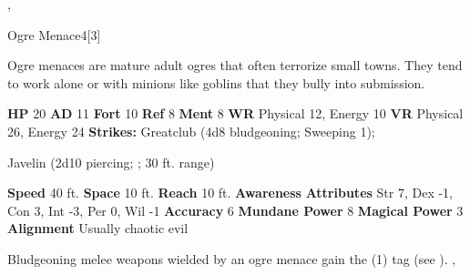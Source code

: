   ,
  \begin{monsubsection}{Ogre Menace}{4}[3]
    \vspace{-1em}\vspace{-1em}
    \vspace{0em}

    
        Ogre menaces are mature adult ogres that often terrorize small towns.
        They tend to work alone or with minions like goblins that they bully into submission.
      
    

    \begin{spellcontent}
      \begin{spelltargetinginfo}
        \pari \textbf{HP} 20 \monsep
          \textbf{AD} 11 \monsep
          \textbf{Fort} 10 \monsep
          \textbf{Ref} 8 \monsep
          \textbf{Ment} 8
        \pari \textbf{WR} Physical 12, Energy 10 \monsep
        \textbf{VR} Physical 26, Energy 24
        \pari \textbf{Strikes:}
            Greatclub  (4d8 bludgeoning; Sweeping 1);
\par Javelin  (2d10 piercing; ; 30 ft. range)
      \end{spelltargetinginfo}
    \end{spellcontent}
    \begin{monsterfooter}
      \pari \textbf{Speed} 40 ft. \monsep
        \textbf{Space} 10 ft. \monsep
        \textbf{Reach} 10 ft.
      \pari \textbf{Awareness} 
      \pari \textbf{Attributes}
        Str 7, Dex -1,
        Con 3, Int -3,
        Per 0, Wil -1
      \pari \textbf{Accuracy} 6 \monsep
        \textbf{Mundane Power} 8 \monsep
      \textbf{Magical Power} 3
      \pari \textbf{Alignment} Usually chaotic evil
    \end{monsterfooter}
  \end{monsubsection}
            Bludgeoning melee weapons wielded by an ogre menace gain the  (1) tag (see ).
  ,
